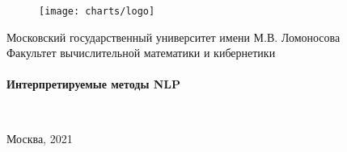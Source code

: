 \begin{center}
    \begin{figure}[h]
        \centering
        \texttt{[image: charts/logo]}
    \end{figure}
    
    \normalsize Московский государственный университет имени М.В. Ломоносова\\
    Факультет вычислительной математики и кибернетики\\
    \\[3.5cm] 
    
    \large \textbf{Интерпретируемые методы NLP} \\[2.6cm] %
    
    \end{center} 
    
    \begin{flushright}
    
    \\
    \end{flushright}
    
    \hfill \break
    \vfill 
    
    \begin{center} 
    \normalsize{Москва, 2021}\\
    \end{center} 
    
    \thispagestyle{empty}